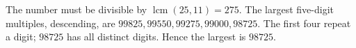 The number must be divisible by $\operatorname{lcm}(25,11)=275$. The largest five-digit multiples, descending, are $99825,99550,99275,99000,98725$. The first four repeat a digit; $98725$ has all distinct digits. Hence the largest is $\boxed{98725}$.
